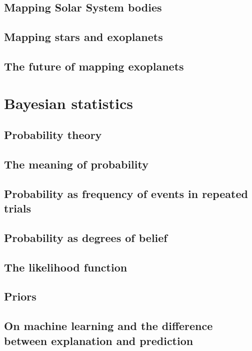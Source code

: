\documentclass[]{report}
\begin{document}
\subsection{Mapping Solar System bodies}
\subsection{Mapping stars and exoplanets}
\subsection{The future of mapping exoplanets}

\section{Bayesian statistics}
\subsection{Probability theory}
\subsection{The meaning of probability}
\subsection{Probability as frequency of events in repeated trials}
\subsection{Probability as degrees of belief}
\subsection{The likelihood function}
\subsection{Priors}
\subsection{On machine learning and the difference between explanation and prediction}
\end{document}

